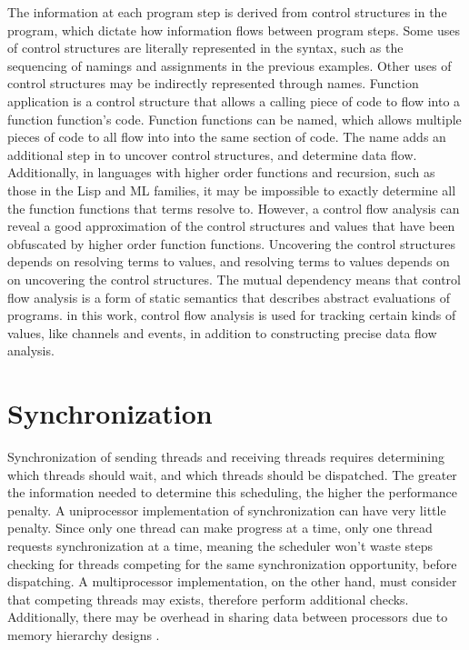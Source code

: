 \documentclass[letterpaper, 11pt]{extarticle}
\begin{document}
The information at each program step is derived from control structures in the program, which
dictate how information flows between program steps. Some uses of control structures are
literally represented in the syntax, such as the sequencing of namings and assignments in the
previous examples. Other uses of control structures may be indirectly represented through
names. Function application is a control structure that allows a calling piece of code to
flow into a function function's code.  Function functions can be named, which allows
multiple pieces of code to all flow into into the same section of code. The name adds an
additional step in to uncover control structures, and determine data flow.
Additionally, in languages with higher order functions and recursion, such as those in the Lisp
and ML families, it may be impossible to exactly determine all the function functions that
terms resolve to. However, a control flow analysis can reveal a good
approximation of the control structures and values that have been obfuscated by higher order
function functions. Uncovering the control structures depends on resolving terms
to values, and resolving terms to values depends on on uncovering the control
structures. The mutual dependency means that control flow analysis is a form of
static semantics that describes abstract evaluations of programs. in this work, control flow
analysis is used for tracking certain kinds of values, like channels and events, in addition to
constructing precise data flow analysis. 


\section{Synchronization}
Synchronization of sending threads and receiving threads
requires determining which threads should wait, and which threads should be dispatched.
The greater the information needed
to determine this scheduling, the higher the performance penalty. A uniprocessor
implementation of synchronization can have very little penalty. Since only one thread can make
progress at a time, only one thread requests synchronization at a time, meaning the scheduler
won't waste steps checking for threads competing for the same synchronization opportunity,
before dispatching. A multiprocessor implementation, on the other hand, must consider that
competing threads may exists, therefore perform additional checks. Additionally, there may be 
overhead in sharing data between processors due to memory hierarchy designs \cite{hennessy2011computer}. 
\end{document}
